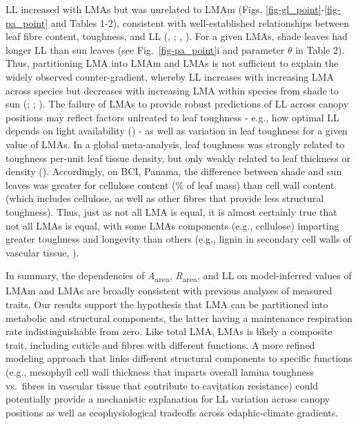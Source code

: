 \documentclass[
  12pt,
  letterpaper,
  DIV=11,
  numbers=noendperiod]{scrartcl}
\begin{document}
LL increased with LMAs but was unrelated to LMAm (Figs.
\ref{fig-gl_point}-\ref{fig-pa_point} and Tables 1-2), consistent with
well-established relationships between leaf fibre content, toughness,
and LL (,
; , ). For a given LMAs, shade
leaves had longer LL than sun leaves (see Fig.~\ref{fig-pa_point}i and
parameter \(\theta\) in Table 2). Thus, partitioning LMA into LMAm and
LMAs is not sufficient to explain the widely observed counter-gradient,
whereby LL increases with increasing LMA across species but decreases
with increasing LMA within species from shade to sun
(;
;
). The failure of LMAs
to provide robust predictions of LL across canopy positions may reflect
factors unlreated to leaf toughness - e.g., how optimal LL depends on
light availability () - as
well as variation in leaf toughness for a given value of LMAs. In a
global meta-analysis, leaf toughness was strongly related to toughness
per-unit leaf tissue density, but only weakly related to leaf thickness
or density (). Accordingly,
on BCI, Panama, the difference between shade and sun leaves was greater
for cellulose content (\% of leaf mass) than cell wall content (which
includes cellulose, as well as other fibres that provide less structural
toughness). Thus, just as not all LMA is equal, it is almost certainly
true that not all LMAs is equal, with some LMAs components (e.g.,
cellulose) imparting greater toughness and longevity than others (e.g.,
lignin in secondary cell walls of vascular tissue,
).

In summary, the dependencies of \emph{A}\textsubscript{area},
\emph{R}\textsubscript{area}, and LL on model-inferred values of LMAm
and LMAs are broadly consistent with previous analyses of measured
traits. Our results support the hypothesis that LMA can be partitioned
into metabolic and structural components, the latter having a
maintenance respiration rate indistinguishable from zero. Like total
LMA, LMAs is likely a composite trait, including cuticle and fibres with
different functions. A more refined modeling approach that links
different structural components to specific functions (e.g., mesophyll
cell wall thickness that imparts overall lamina toughness vs.~fibres in
vascular tissue that contribute to cavitation resistance) could
potentially provide a mechanistic explanation for LL variation across
canopy positions as well as ecophysiological tradeoffs across
edaphic-climate gradients.
\end{document}
